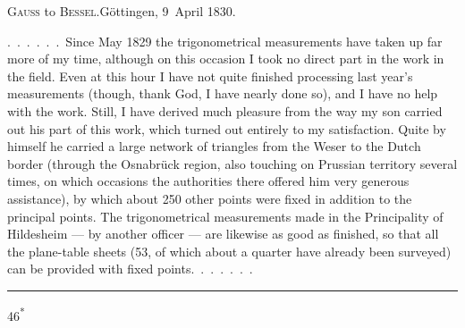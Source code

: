 \begin{center}
\textsc{Gauss} to \textsc{Bessel}.\quad Göttingen, 9~April 1830.
\end{center}

\par\noindent\hspace*{\parindent}.\ .\ .\ .\ .\ .\ Since May 1829 the trigonometrical measurements have taken up far more of my time, although on this occasion I took no direct part in the work in the field.
Even at this hour I have not quite finished processing last year's measurements (though, thank God, I have nearly done so), and I have no help with the work.
Still, I have derived much pleasure from the way my son carried out his part of this work, which turned out entirely to my satisfaction.
Quite by himself he carried a large network of triangles from the Weser to the Dutch border (through the Osnabrück region, also touching on Prussian territory several times, on which occasions the authorities there offered him very generous assistance), by which about 250 other points were fixed in addition to the principal points.
The trigonometrical measurements made in the Principality of Hildesheim --- by another officer --- are likewise as good as finished, so that all the plane-table sheets (53, of which about a quarter have already been surveyed) can be provided with fixed points.\ .\ .\ .\ .\ .\ .

\begin{center}\rule{.24\linewidth}{.4pt}\end{center}
\par\smallskip\noindent\hfill{\footnotesize 46\textsuperscript{*}}\par
